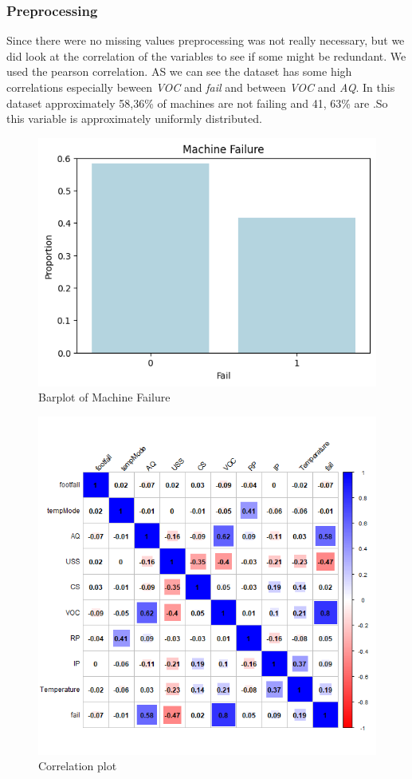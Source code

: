 \documentclass{article}
\begin{document}
\subsubsection{Preprocessing}
Since there were no missing values preprocessing was not really necessary, but we did look at the correlation of the variables to see if some might be redundant. We used the pearson correlation. AS we can see the dataset has some high correlations especially beween \textit{VOC} and \textit{fail} and between \textit{VOC} and \textit{AQ}. In this dataset approximately 58,36\% of machines are not failing and 41, 63\% are .So this variable is approximately uniformly distributed. 
\begin{figure}[H]
\centering
\includegraphics[width=1\linewidth]{MachineFailure.png}
\caption{\label{fig:bar:failure} Barplot of Machine Failure}
\end{figure}
\begin{figure}[H]
\centering
\includegraphics[width=0.8\linewidth]{plots_correlation_Machine.png}
\caption{\label{fig:cor_machine} Correlation plot}
\end{figure}
\end{document}
